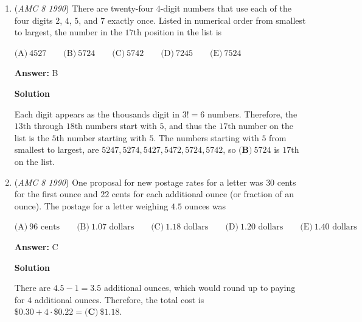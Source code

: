 \begin{enumerate}
 If the numbers were $\{10,11,12,13,14,15\}$, each pair of opposite faces would sum to $\frac{10+11+12+13+14+15}{3}=25$.  But $11$ would be opposite $14$, which is not the case on this cube.

 Therefore, the numbers are $\{11,12,13,14,15,16\}$, which works if $16$, $13$, and $12$ are placed opposite $11$, $14$, and $15$ respectively.  In this case, the sum is $11+12+13+14+15+16=\boxed{\textbf{(E)}\ 81}$.

 


	\item (\textit{AMC 8 1990}) There are twenty-four $4$-digit numbers that use each of the four digits $2$, $4$, $5$, and $7$ exactly once.  Listed in numerical order from smallest to largest, the number in the $17\text{th}$ position in the list is


 $\text{(A)}\ 4527 \qquad \text{(B)}\ 5724 \qquad \text{(C)}\ 5742 \qquad \text{(D)}\ 7245 \qquad \text{(E)}\ 7524$

 \textbf{Answer: }B



\textbf{Solution}

Each digit appears as the thousands digit in $3!=6$ numbers. Therefore, the $13\text{th}$ through $18\text{th}$ numbers start with $5$, and thus the $17\text{th}$ number on the list is the $5\text{th}$ number starting with $5$.  The numbers starting with $5$ from smallest to largest, are $5247,5274,5427,5472,5724,5742$, so $\boxed{\textbf{(B)}\ 5724}$ is $17\text{th}$ on the list.

 


	\item (\textit{AMC 8 1990}) One proposal for new postage rates for a letter was $30$ cents for the first ounce and $22$ cents for each additional ounce (or fraction of an ounce).  The postage for a letter weighing $4.5$ ounces was


 $\text{(A)}\ \text{96 cents} \qquad \text{(B)}\ \text{1.07 dollars} \qquad \text{(C)}\ \text{1.18 dollars} \qquad \text{(D)}\ \text{1.20 dollars} \qquad \text{(E)}\ \text{1.40 dollars}$

 \textbf{Answer: }C



\textbf{Solution}

There are $4.5-1=3.5$ additional ounces, which would round up to paying for $4$ additional ounces.  Therefore, the total cost is $\$0.30 + 4 \cdot \$ 0.22 = \boxed{\textbf{(C)}\ \$1.18}$.

 



\end{enumerate}
